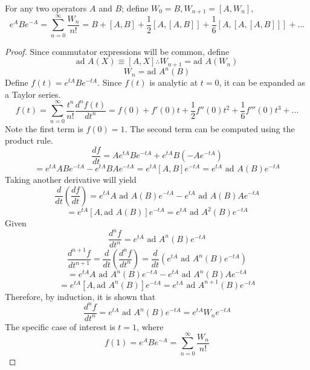 \begin{sol}
\begin{theorem}
For any two operators $A$ and $B$; define $W_0=B, W_{n+1}=[A,W_n]$,
$$e^ABe^{-A}=\sum_{n=0}^\infty\frac{W_n}{n!}=B+[A,B]+\frac{1}{2}[A,[A,B]]+\frac{1}{6}[A,[A,[A,B]]]+...$$ 
\end{theorem}
\begin{proof}
Since commutator expressions will be common, define
$$\text{ad } A(X)\equiv[A,X]\therefore W_{n+1}=\text{ad }  A(W_n)$$
$$W_n=\text{ad }A^n(B)$$
Define $f(t)=e^{tA}Be^{-tA}$. Since $f(t)$ is analytic at $t=0$, it can be expanded as a Taylor series.
$$f(t)=\sum_{n=0}^\infty \frac{t^n}{n!}\frac{d^nf(t)}{dt^n}=f(0)+f'(0)t+\frac{1}{2}f''(0)t^2+\frac{1}{6}f'''(0)t^3+...$$ 
Note the first term is $f(0)=1$. The second term can be computed using the product rule.
$$\frac{df}{dt}=Ae^{tA}Be^{-tA}+e^{tA}B(-Ae^{-tA})$$ $$=e^{tA}ABe^{-tA}-e^{tA}BAe^{-tA}=e^{tA}[A,B]e^{-tA}=e^{tA}\text{ ad }A(B)e^{-tA}$$ 
Taking another derivative will yield
$$\frac{d}{dt}\left(\frac{df}{dt}\right)=e^{tA}A\text{ ad }A(B)e^{-tA}-e^{tA}\text{ ad }A(B)Ae^{-tA}$$ 
$$=e^{tA}[A,\text{ad }A(B)]e^{-tA}=e^{tA}\text{ ad }A^2(B)e^{-tA}$$  
Given 
$$\frac{d^nf}{dt^n}=e^{tA}\text{ ad }A^n(B)e^{-tA}$$
$$\frac{d^{n+1}f}{dt^{n+1}}=\frac{d}{dt}\left(\frac{d^nf}{dt^n}\right)=\frac{d}{dt}\left(e^{tA}\text{ ad }A^n(B)e^{-tA}\right)$$
$$=e^{tA}A\text{ ad }A^{n}(B)e^{-tA}-e^{tA}\text{ ad }A^{n}(B)Ae^{-tA}$$ 
$$=e^{tA}[A,\text{ad }A^{n}(B)]e^{-tA}=e^{tA}\text{ ad }A^{n+1}(B)e^{-tA}$$
Therefore, by induction, it is shown that 
$$\frac{d^nf}{dt^n}=e^{tA}\text{ ad }A^n(B)e^{-tA}=e^{tA}W_ne^{-tA}$$
The specific case of interest is $t=1$, where 
$$f(1)=e^{A}Be^{-A}=\sum_{n=0}^\infty\frac{W_n}{n!}$$
\end{proof}
\end{sol}